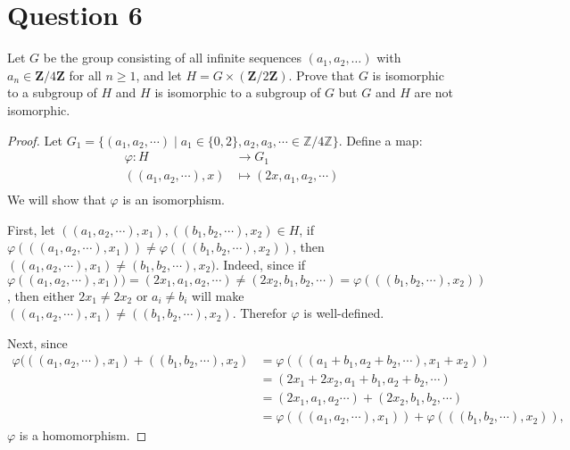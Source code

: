 \section{Question 6}

\begin{question}
    Let $G$ be the group consisting of all infinite sequences $\left(a_1, a_2, \ldots\right)$ with $a_n \in \mathbf{Z} / 4 \mathbf{Z}$ for all $n \geq 1$, and let $H=G \times(\mathbf{Z} / 2 \mathbf{Z})$. Prove that $G$ is isomorphic to a subgroup of $H$ and $H$ is isomorphic to a subgroup of $G$ but $G$ and $H$ are not isomorphic.
\end{question}

\begin{answer}
    \begin{proof}
        Let $G_1 = \{(a_1,a_2,\cdots) \mid a_1 \in \{0,2\}, a_2,a_3,\cdots \in \mathbb{Z}/4\mathbb{Z}\}$. Define a map:
        \begin{equation}
            \begin{aligned}
                \varphi: H &\to G_1\\
                ((a_1,a_2,\cdots),x) &\mapsto (2x,a_1,a_2,\cdots)\\
            \end{aligned}
        \end{equation}
        We will show that $\varphi$ is an isomorphism.
        
        First, let $((a_1,a_2,\cdots),x_1), ((b_1,b_2,\cdots),x_2) \in H$, if $\varphi(((a_1,a_2,\cdots),x_1)) \neq \varphi(((b_1,b_2,\cdots),x_2))$, then $((a_1,a_2,\cdots),x_1)\neq(b_1,b_2,\cdots),x_2)$. Indeed, since if $\varphi((a_1,a_2,\cdots),x_1)) = (2x_1,a_1,a_2,\cdots) \neq (2x_2,b_1,b_2,\cdots) = \varphi(((b_1,b_2,\cdots),x_2))$, then either $2x_1\neq 2x_2$ or $a_i \neq b_i$ will make $((a_1,a_2,\cdots),x_1) \neq ((b_1,b_2,\cdots),x_2)$. Therefor $\varphi$ is well-defined.
        
        Next, since
        \begin{equation}
            \begin{aligned}
                \varphi(((a_1,a_2,\cdots),x_1)+((b_1,b_2,\cdots),x_2) &= \varphi(((a_1+b_1,a_2+b_2,\cdots),x_1+x_2))\\
                &= (2x_1+2x_2,a_1+b_1,a_2+b_2,\cdots)\\
                &= (2x_1,a_1,a_2\cdots) + (2x_2,b_1,b_2,\cdots)\\
                &= \varphi(((a_1,a_2,\cdots),x_1)) + \varphi(((b_1,b_2,\cdots),x_2)),
            \end{aligned}
        \end{equation}
        $\varphi$ is a homomorphism.
        

\end{proof}
\end{answer}
